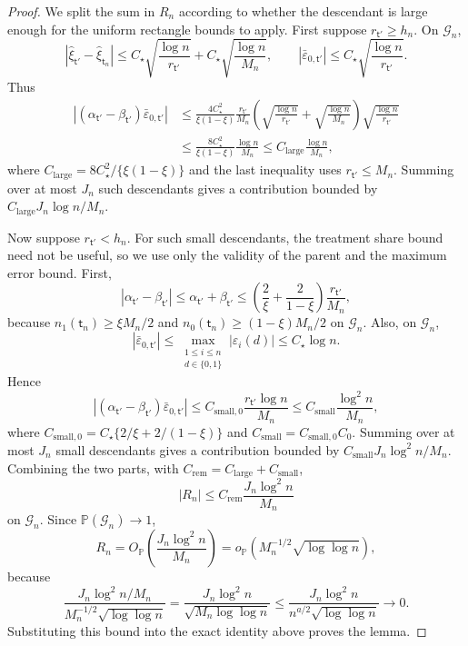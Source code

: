 \documentclass[10pt]{article}
\def\nodet{\mathsf{t}}
\def\P{\mathbb{P}}
\theoremstyle{definition}
\theoremstyle{remark}
\begin{document}
\begin{proof}
We split the sum in $R_n$ according to whether the descendant is large enough
for the uniform rectangle bounds to apply. First suppose $r_{\nodet'}\geq h_n$.
On $\mathcal G_n$,
\[
    |\hat\xi_{\nodet'}-\hat\xi_{\nodet_n}|
    \leq
    C_\star
    \sqrt{\frac{\log n}{r_{\nodet'}}}
    +
    C_\star
    \sqrt{\frac{\log n}{M_n}},
    \qquad
    |\bar\varepsilon_{0,\nodet'}|
    \leq
    C_\star
    \sqrt{\frac{\log n}{r_{\nodet'}}}.
\]
Thus
\[
\begin{aligned}
    |(\alpha_{\nodet'}-\beta_{\nodet'})
        \bar\varepsilon_{0,\nodet'}|
    &\leq
    \frac{4C_\star^2}{\xi(1-\xi)}
    \frac{r_{\nodet'}}{M_n}
    \left(
        \sqrt{\frac{\log n}{r_{\nodet'}}}
        +
        \sqrt{\frac{\log n}{M_n}}
    \right)
    \sqrt{\frac{\log n}{r_{\nodet'}}}  \\
    &\leq
    \frac{8C_\star^2}{\xi(1-\xi)}
    \frac{\log n}{M_n}
    \leq
    C_{\mathrm{large}}\frac{\log n}{M_n},
\end{aligned}
\]
where $C_{\mathrm{large}}=8C_\star^2/\{\xi(1-\xi)\}$ and the last inequality uses $r_{\nodet'}\leq M_n$. Summing over at most $J_n$ such descendants gives a contribution bounded by $C_{\mathrm{large}}J_n\log n/M_n$.

Now suppose $r_{\nodet'}<h_n$. For such small descendants, the treatment share
bound need not be useful, so we use only the validity of the parent and the
maximum error bound. First,
\[
    |\alpha_{\nodet'}-\beta_{\nodet'}|
    \leq
    \alpha_{\nodet'}+\beta_{\nodet'}
    \leq
    \left(\frac{2}{\xi}+\frac{2}{1-\xi}\right)
    \frac{r_{\nodet'}}{M_n},
\]
because $n_1(\nodet_n)\geq \xi M_n/2$ and $n_0(\nodet_n)\geq (1-\xi)M_n/2$ on $\mathcal G_n$. Also, on $\mathcal G_n$,
\[
    |\bar\varepsilon_{0,\nodet'}|
    \leq
    \max_{\substack{1\leq i\leq n\\ d\in\{0,1\}}}
    |\varepsilon_i(d)|
    \leq
    C_\star
    \log n.
\]
Hence
\[
    |(\alpha_{\nodet'}-\beta_{\nodet'})
        \bar\varepsilon_{0,\nodet'}|
    \leq
    C_{\mathrm{small},0}
    \frac{r_{\nodet'}\log n}{M_n}
    \leq
    C_{\mathrm{small}}
    \frac{\log^2 n}{M_n},
\]
where $C_{\mathrm{small},0}=C_\star\{2/\xi+2/(1-\xi)\}$ and $C_{\mathrm{small}}=C_{\mathrm{small},0}C_0$. Summing over at most $J_n$ small descendants gives a contribution bounded by $C_{\mathrm{small}}J_n\log^2 n/M_n$. Combining the two parts, with $C_{\mathrm{rem}}=C_{\mathrm{large}}+C_{\mathrm{small}}$,
\[
    |R_n|
    \leq
    C_{\mathrm{rem}}
    \frac{J_n\log^2 n}{M_n}
\]
on $\mathcal G_n$. Since $\P(\mathcal G_n)\to1$,
\[
    R_n
    =
    O_\P\!\left(\frac{J_n\log^2 n}{M_n}\right)
    =
    o_\P\!\left(M_n^{-1/2}\sqrt{\log\log n}\right),
\]
because
\[
    \frac{J_n\log^2 n/M_n}
         {M_n^{-1/2}\sqrt{\log\log n}}
    =
    \frac{J_n\log^2 n}{\sqrt{M_n\log\log n}}
    \leq
    \frac{J_n\log^2 n}{n^{a/2}\sqrt{\log\log n}}
    \to0.
\]
Substituting this bound into the exact identity above proves the lemma.
\end{proof}
\end{document}
